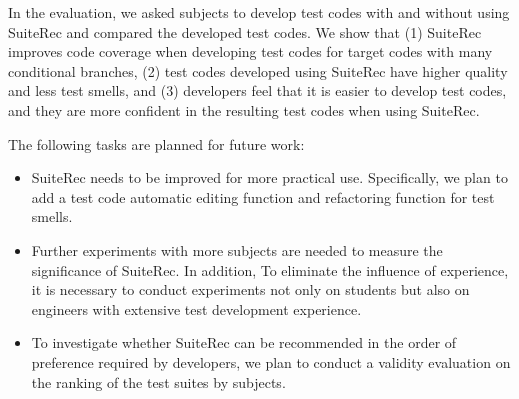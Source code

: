 \documentclass[conference]{IEEEtran}
\begin{document}
In the evaluation, we asked subjects to develop test codes with and without using SuiteRec and compared the developed test codes. We show that (1) SuiteRec improves code coverage when developing test codes for target codes with many conditional branches, (2) test codes developed using SuiteRec have higher quality and less test smells, and (3) developers feel that it is easier to develop test codes, and they are more confident in the resulting test codes when using SuiteRec.

The following tasks are planned for future work:

\begin{itemize}
\item SuiteRec needs to be improved for more practical use. Specifically, we plan to add a test code automatic editing function and refactoring function for test smells.
\item Further experiments with more subjects are needed to measure the significance of SuiteRec. In addition, To eliminate the influence of experience, it is necessary to conduct experiments not only on students but also on  engineers with extensive test development experience.
\item To investigate whether SuiteRec can be recommended in the order of preference required by developers, we plan to conduct a validity evaluation on the ranking of the test suites by subjects.
\end{itemize}








\end{document}
